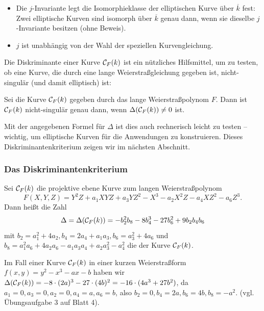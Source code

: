 \begin{bem}
	\begin{itemize}
		\item Die $j$-Invariante legt die Isomorphieklasse der elliptischen Kurve über $\overline{k}$ fest: Zwei elliptische Kurven sind isomorph über $\overline{k}$ genau dann, wenn sie dieselbe $j$-Invariante besitzen (ohne Beweis).
		\item $j$ ist unabhängig von der Wahl der speziellen Kurvengleichung.
	\end{itemize}
\end{bem}

\begin{bem}
	Die Diskriminante einer Kurve $\mathcal{C}_F(k)$ ist ein nützliches Hilfsmittel, um zu testen, ob eine Kurve, die durch eine lange Weierstraßgleichung gegeben ist, nicht-singulär (und damit elliptisch) ist:
\end{bem}

\begin{satz}
	Sei die Kurve $\mathcal{C}_F(k)$ gegeben durch das lange Weierstraßpolynom $F$. Dann ist $\mathcal{C}_F(k)$ nicht-singulär genau dann, wenn $\Delta(\mathcal{C}_F(k)) \neq 0$ ist.
\end{satz}

Mit der angegebenen Formel für $\Delta$ ist dies auch rechnerisch leicht zu testen -- wichtig, um elliptische Kurven für die Anwendungen zu konstruieren. Dieses Diskriminantenkriterium zeigen wir im nächsten Abschnitt.
\nextlecture
\subsubsection{Das Diskriminantenkriterium}
\begin{defn}[Diskriminante]
	Sei $\mathcal{C}_F(k)$ die projektive ebene Kurve zum langen Weierstraßpolynom \marginnote{[12]}
	\[ F(X,Y,Z) = Y^2Z + a_1XYZ + a_3YZ^2 - X^3 - a_2X^2Z - a_4 XZ^2 - a_6Z^3. \]
	Dann heißt die Zahl
	\[ \Delta = \Delta(\mathcal{C}_F(k)) = -b_2^2 b_8 - 8b_4^3 - 27b_6^2 + 9b_2b_4b_6 \]
	mit $b_2 = a_1^2 + 4a_2, b_4 = 2a_4+a_1a_3, b_6 = a_3^2+4a_6$ und $b_8 = a_1^2 a_6 + 4a_2a_6-a_1a_3a_4 + a_2a_3^2 - a_4^2$ die  der Kurve $\mathcal{C}_F(k)$.
\end{defn}

\begin{bem}
	Im Fall einer Kurve $\mathcal{C}_F(k)$ in einer kurzen Weierstraßform $f(x,y) = y^2-x^3-ax-b$ haben wir $\Delta(\mathcal{C}_F(k)) = -8 \cdot (2a)^3 - 27 \cdot (4b)^2 = -16 \cdot (4a^3 + 27b^2)$, da $a_1 = 0, a_3 = 0, a_2 = 0, a_4 = a, a_6 = b$, also $b_2 = 0, b_4 = 2a, b_6 = 4b, b_8 = -a^2$. (vgl. Übungsaufgabe 3 auf Blatt 4).
\end{bem}

